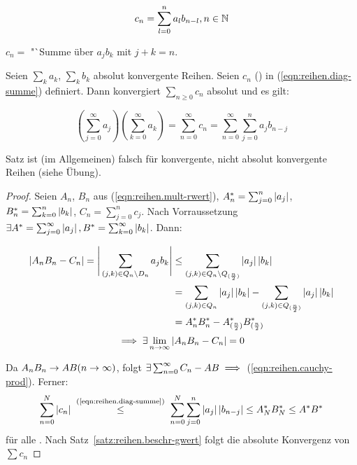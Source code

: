 \documentclass[12pt]{scrreprt}
\begin{document}
\begin{equation}\label{eqn:reihen.diag-summe}
c_n = \sum_{l=0}^n a_lb_{n-l}, n \in \mathbb{N}
\end{equation}

$c_n = $ "`Summe über $a_jb_k$ mit $j+k = n$.

\begin{satz}\label{satz:reihen.cauchy-prod}
Seien $\sum_k a_k$, $\sum_k b_k$ absolut konvergente Reihen. Seien $c_n$ () in (\ref{eqn:reihen.diag-summe}) definiert.
Dann konvergiert $\sum_{n\ge0} c_n$ absolut und es gilt:

\begin{equation}\label{eqn:reihen.cauchy-prod}
\left(\sum_{j=0}^\infty a_j\right)\left(\sum_{k=0}^\infty a_k\right) = \sum_{n=0}^\infty c_n = \sum_{n=0}^\infty \sum_{j=0}^n a_jb_{n-j}
\end{equation}
\end{satz}

\begin{bem*}
Satz ist (im Allgemeinen) falsch für konvergente, nicht absolut konvergente Reihen (siehe Übung).
\end{bem*}

\begin{proof}
Seien $A_n$, $B_n$ aus (\ref{eqn:reihen.mult-rwert}), $A_n^* = \sum_{j=0}^n \left\lvert a_j\right\lvert$, $B_n^* = \sum_{k=0}^n \left\lvert b_k\right\lvert$,
$C_n = \sum_{j=0}^n c_j$. Nach Vorraussetzung $\exists A^* = \sum_{j=0}^\infty \left\lvert a_j\right\lvert, B^* = \sum_{k=0}^\infty \left\lvert b_k\right\lvert$.
Dann:

\begin{align*}
\left\lvert A_nB_n - C_n\right\lvert = \Bigg\lvert\sum_{(j,k)\in Q_n\backslash D_n} a_jb_k\Bigg\lvert &\le 
	\sum_{(j,k)\in Q_n\backslash Q_{(\frac{n}{2})}} \left\lvert a_j\right\lvert\left\lvert b_k\right\lvert \\
	&= \sum_{(j,k)\in Q_n} \left\lvert a_j\right\lvert\left\lvert b_k\right\lvert - \sum_{(j,k)\in Q_{(\frac{n}{2})}} \left\lvert a_j\right\lvert\left\lvert b_k\right\lvert\\
	&= A_n^*B_n^* - A_{(\frac{n}{2})}^*B_{(\frac{n}{2})}^*
\end{align*}
\[\implies \exists\lim_{n\rightarrow\infty} \left\lvert A_nB_n - C_n\right\lvert = 0\]

Da $A_nB_n \rightarrow AB (n\rightarrow\infty)$, folgt $\exists\sum_{n=0}^\infty C_n - AB \implies$ (\ref{eqn:reihen.cauchy-prod}).
Ferner: \[\sum_{n=0}^N \abs{c_n} \nach{\le}{(\ref{eqn:reihen.diag-summe})}
\sum_{n=0}^N\sum_{j=0}^n \abs{a_j}\abs{b_{n-j}} \le %
A_N^*B_N^* \le A^*B^*\] für alle . Nach Satz~\ref{satz:reihen.beschr-gwert} folgt die absolute Konvergenz von $\sum c_n$
\end{proof}
\end{document}
